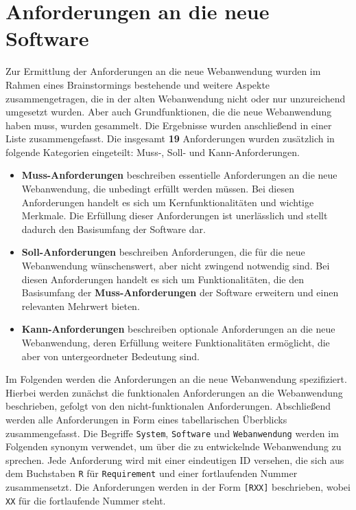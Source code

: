 
\chapter{Anforderungen an die neue Software}
\label{chapter:5}

Zur Ermittlung der Anforderungen an die neue Webanwendung wurden im Rahmen eines Brainstormings bestehende und weitere Aspekte zusammengetragen, die in der alten Webanwendung nicht oder nur unzureichend umgesetzt wurden. Aber auch Grundfunktionen, die die neue Webanwendung haben muss, wurden gesammelt. Die Ergebnisse wurden anschließend in einer Liste zusammengefasst. Die insgesamt \textbf{19} Anforderungen wurden zusätzlich in folgende Kategorien eingeteilt: Muss-, Soll- und Kann-Anforderungen.

\begin{itemize}
    \item \textbf{Muss-Anforderungen} beschreiben essentielle Anforderungen an die neue Webanwendung, die unbedingt erfüllt werden müssen. Bei diesen Anforderungen handelt es sich um Kernfunktionalitäten und wichtige Merkmale. Die Erfüllung dieser Anforderungen ist unerlässlich und stellt dadurch den Basisumfang der Software dar.

    \item \textbf{Soll-Anforderungen} beschreiben Anforderungen, die für die neue Webanwendung wünschenswert, aber nicht zwingend notwendig sind. Bei diesen Anforderungen handelt es sich um Funktionalitäten, die den Basisumfang der \textbf{Muss-Anforderungen} der Software erweitern und einen relevanten Mehrwert bieten.

    \item \textbf{Kann-Anforderungen} beschreiben optionale Anforderungen an die neue Webanwendung, deren Erfüllung weitere Funktionalitäten ermöglicht, die aber von untergeordneter Bedeutung sind.
\end{itemize}

Im Folgenden werden die Anforderungen an die neue Webanwendung spezifiziert. Hierbei werden zunächst die funktionalen Anforderungen an die Webanwendung beschrieben, gefolgt von den nicht-funktionalen Anforderungen. Abschließend werden alle Anforderungen in Form eines tabellarischen Überblicks zusammengefasst. Die Begriffe \texttt{System}, \texttt{Software} und \texttt{Webanwendung} werden im Folgenden synonym verwendet, um über die zu entwickelnde Webanwendung zu sprechen. Jede Anforderung wird mit einer eindeutigen ID versehen, die sich aus dem Buchstaben \texttt{R} für \texttt{Requirement} und einer fortlaufenden Nummer zusammensetzt. Die Anforderungen werden in der Form \texttt{[RXX]} beschrieben, wobei \texttt{XX} für die fortlaufende Nummer steht.

